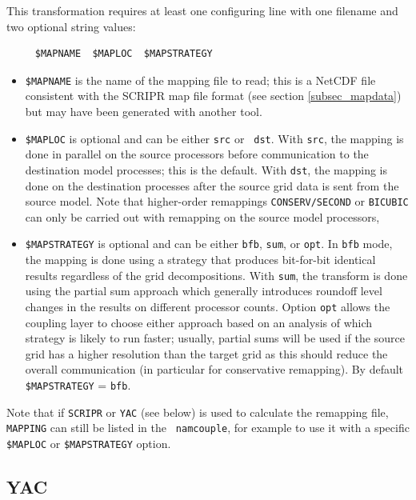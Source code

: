  This transformation requires at least one configuring line with one filename and two optional string values:
\begin{verbatim}
     $MAPNAME  $MAPLOC  $MAPSTRATEGY
\end{verbatim}
  \begin{itemize}
  \item {\tt \$MAPNAME} is the name of the mapping file to read; this
    is a NetCDF file consistent with the SCRIPR map file format (see
    section \ref{subsec_mapdata}) but may have been generated with another tool.

  \item {\tt \$MAPLOC} is optional and can be either {\tt src} or {\tt
      dst}.  With {\tt src}, the mapping is done in parallel on
    the source processors before communication to the destination
    model processes; this is the default.  With {\tt dst}, the mapping
    is done on the destination processes after the source grid data is
    sent from the source model. Note that higher-order remappings {\tt CONSERV/SECOND} or {\tt BICUBIC} can only be carried 
    out with remapping on the source model processors,

  \item {\tt \$MAPSTRATEGY} is optional and can be either {\tt bfb},
    {\tt sum}, or {\tt opt}.  In {\tt bfb} mode, the mapping is done
    using a strategy that produces bit-for-bit identical results
    regardless of the grid decompositions.  With {\tt sum}, the
    transform is done using the partial sum approach which generally
    introduces roundoff level changes in the results on different
    processor counts. Option {\tt opt} allows the coupling layer to
    choose either approach based on an analysis of which strategy is
    likely to run faster; usually, partial sums will be used if the
    source grid has a higher resolution than the target grid as this
    should reduce the overall communication (in particular for conservative
    remapping). By default {\tt \$MAPSTRATEGY} = {\tt bfb}.

  \end{itemize}

  Note that if {\tt SCRIPR} or {\tt YAC} (see below) is used to calculate the
  remapping file, {\tt MAPPING} can still be listed in the {\tt
    namcouple}, for example to use it with a specific {\tt
    \$MAPLOC} or {\tt \$MAPSTRATEGY} option.

\subsection{YAC}
\label{subsec_yac}


